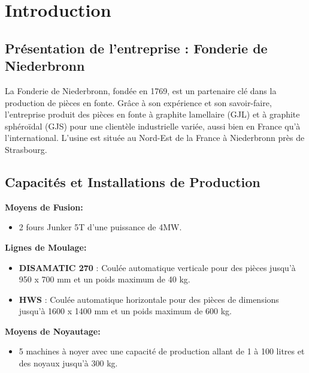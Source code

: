 \documentclass[12pt]{article}
\begin{document}
\newpage

\tableofcontents

\newpage

\section{Introduction}



\subsection{Présentation de l'entreprise : Fonderie de Niederbronn}


La Fonderie de Niederbronn, fondée en 1769, est un partenaire clé dans la production de pièces 
en fonte. Grâce à son expérience et son savoir-faire, l'entreprise produit des pièces en fonte 
à graphite lamellaire (GJL) et à graphite sphéroïdal (GJS) pour une clientèle industrielle variée,
aussi bien en France qu'à l'international. L’usine est située au Nord-Est de la France 
à Niederbronn près de Strasbourg.



\subsection*{Capacités et Installations de Production}
\textbf{Moyens de Fusion:}
\begin{itemize}
    \item 2 fours Junker 5T d'une puissance de 4MW.
\end{itemize}

\textbf{Lignes de Moulage:}
\begin{itemize}
    \item \textbf{DISAMATIC 270} : Coulée automatique verticale pour des pièces jusqu'à 950 x 700 mm et un poids maximum de 40 kg.
    \item \textbf{HWS} : Coulée automatique horizontale pour des pièces de dimensions jusqu'à 1600 x 1400 mm et un poids maximum de 600 kg.
\end{itemize}

\textbf{Moyens de Noyautage:}
\begin{itemize}
    \item 5 machines à noyer avec une capacité de production allant de 1 à 100 litres et des noyaux jusqu'à 300 kg.
\end{itemize}
\end{document}
